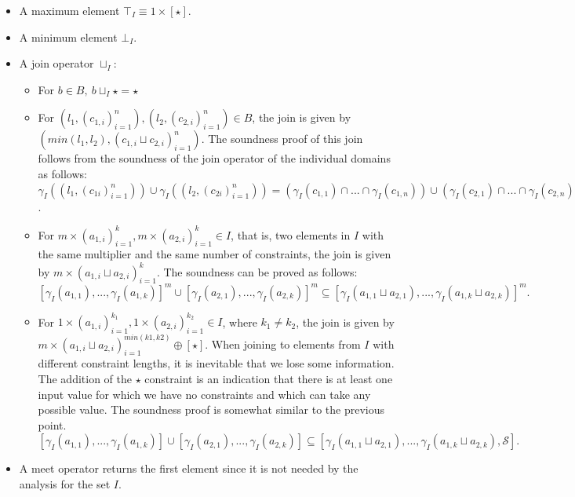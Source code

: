 \documentclass[10pt]{report}
\begin{document}
\begin{itemize}
	\item A maximum element $ \top_{I} \equiv 1 \times [\star] .$
	\item A minimum element $ \bot_{I}. $
	\item A join operator $\sqcup_{I}$:
	\begin{itemize}
		\item For $ b \in B,\ b \sqcup_{I} \star = \star$
		\item For $(l_{1}, (c_{1,i})_{i=1}^{n}), (l_{2}, (c_{2,i})_{i=1}^{n}) \in B$, the join is given by $ (min(l_{1}, l_{2}), (c_{1,i} \sqcup c_{2,i})_{i=1}^{n}) $. The soundness proof of this join follows from the soundness of the join operator of the individual domains as follows: $ \gamma_{I}((l_{1}, (c_{1i})_{i=1}^{n})) \cup \gamma_{I}((l_{2}, (c_{2i})_{i=1}^{n})) = (\gamma_{I}(c_{1,1}) \cap ... \cap \gamma_{I}(c_{1, n})) \cup (\gamma_{I}(c_{2,1}) \cap ... \cap \gamma_{I}(c_{2, n})) \subseteq \gamma_{I}(c_{1, 1} \sqcup c_{2, 1}) \cap ... \cap \gamma_{I}(c_{1, n} \sqcup c_{2, n}) $. 
		\item For $ m \times (a_{1,i})_{i=1}^{k}, m \times (a_{2,i})_{i=1}^{k}  \in I$, that is, two elements in $ I $ with the same multiplier and the same number of constraints, the join is given by $ m \times (a_{1,i} \sqcup a_{2,i})_{i=1}^{k} $. The soundness can be proved as follows: $ [\gamma_{I}(a_{1,1}), ..., \gamma_{I}(a_{1,k})]^{m} \cup [\gamma_{I}(a_{2,1}), ..., \gamma_{I}(a_{2, k})]^{m} \subseteq [\gamma_{I}(a_{1,1} \sqcup a_{2, 1}), ..., \gamma_{I}(a_{1, k} \sqcup a_{2, k})]^{m}.$
		\item For $ 1 \times (a_{1, i})_{i=1}^{k_{1}}, 1 \times (a_{2, i})_{i=1}^{k_{2}} \in I $, where $ k_{1} \neq k_{2} $, the join is given by $ m \times (a_{1,i} \sqcup a_{2,i})_{i=1}^{min(k1, k2)} \oplus [\star]$. When joining to elements from $ I $ with different constraint lengths, it is inevitable that we lose some information. The addition of the $ \star $ constraint is an indication that there is at least one input value for which we have no constraints and which can take any possible value. The soundness proof is somewhat similar to the previous point. $ [\gamma_{I}(a_{1,1}), ..., \gamma_{I}(a_{1,k})] \cup [\gamma_{I}(a_{2,1}), ..., \gamma_{I}(a_{2, k})] \subseteq [\gamma_{I}(a_{1,1} \sqcup a_{2, 1}), ..., \gamma_{I}(a_{1, k} \sqcup a_{2, k}), \mathcal{S}].$
	\end{itemize}
	\item A meet operator returns the first element since it is not needed by the analysis for the set $ I $. 
	

\end{itemize}
\end{document}
